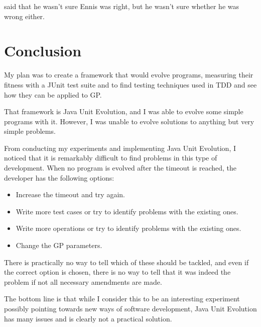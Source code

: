 \documentclass[a4paper]{article}
\begin{document}
\cite{beck2002} said that he wasn't sure Ennis was right, but he
wasn't sure whether he was wrong either.

\section{Conclusion}

My plan was to create a framework that would evolve programs,
measuring their fitness with a JUnit test suite and to find testing
techniques used in TDD and see how they can be applied to GP.

That framework is Java Unit Evolution, and I was able to evolve some
simple programs with it. However, I was unable to evolve solutions to
anything but very simple problems.

From conducting my experiments and implementing Java Unit Evolution, I
noticed that it is remarkably difficult to find problems in this type
of development. When no program is evolved after the timeout is
reached, the developer has the following options:

\begin{itemize}
\item Increase the timeout and try again.
\item Write more test cases or try to identify problems with the
  existing ones.
\item Write more operations or try to identify problems with the
  existing ones.
\item Change the GP parameters.
\end{itemize}

There is practically no way to tell which of these should be tackled,
and even if the correct option is chosen, there is no way to tell that
it was indeed the problem if not all necessary amendments are
made.

The bottom line is that while I consider this to be an interesting
experiment possibly pointing towards new ways of software development,
Java Unit Evolution has many issues and is clearly not a practical
solution.
\end{document}
